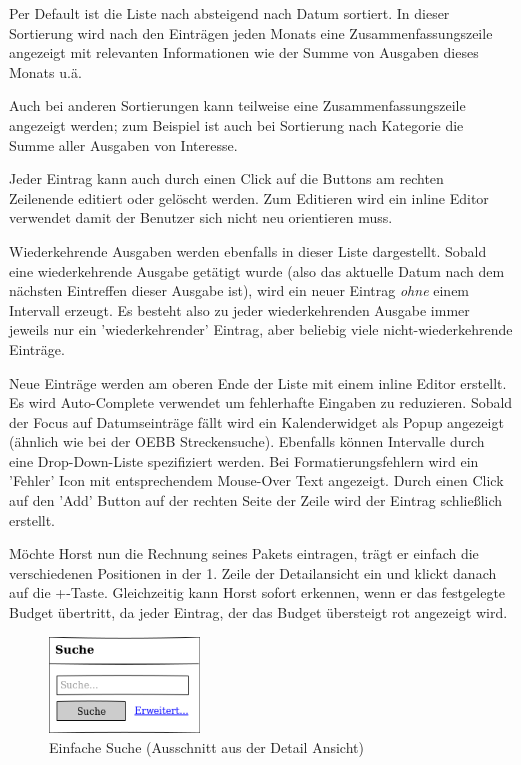 Per Default ist die Liste nach absteigend nach Datum sortiert. In dieser Sortierung wird nach den
Einträgen jeden Monats eine Zusammenfassungszeile angezeigt mit relevanten Informationen wie der Summe von Ausgaben dieses Monats u.ä.

Auch bei anderen Sortierungen kann teilweise eine Zusammenfassungszeile angezeigt werden; zum Beispiel ist auch
bei Sortierung nach Kategorie die Summe aller Ausgaben von Interesse.

Jeder Eintrag kann auch durch einen Click auf die Buttons am rechten Zeilenende editiert oder gelöscht werden.
Zum Editieren wird ein inline Editor verwendet damit der Benutzer sich nicht neu orientieren muss.

Wiederkehrende Ausgaben werden ebenfalls in dieser Liste dargestellt. Sobald eine wiederkehrende Ausgabe getätigt wurde
(also das aktuelle Datum nach dem nächsten Eintreffen dieser Ausgabe ist), wird ein neuer Eintrag \emph{ohne} einem Intervall
erzeugt. Es besteht also zu jeder wiederkehrenden Ausgabe immer jeweils nur ein 'wiederkehrender' Eintrag, aber beliebig viele
nicht-wiederkehrende Einträge.

Neue Einträge werden am oberen Ende der Liste mit einem inline Editor erstellt. Es wird Auto-Complete verwendet um fehlerhafte
Eingaben zu reduzieren. Sobald der Focus auf Datumseinträge fällt wird ein Kalenderwidget als Popup angezeigt (ähnlich wie bei der
OEBB Streckensuche). Ebenfalls können Intervalle durch eine Drop-Down-Liste spezifiziert werden. Bei Formatierungsfehlern wird ein 'Fehler' Icon mit entsprechendem Mouse-Over Text angezeigt. Durch einen Click
auf den 'Add' Button auf der rechten Seite der Zeile wird der Eintrag
schließlich erstellt.

M\"ochte Horst nun die Rechnung seines Pakets eintragen, trägt er einfach die
verschiedenen Positionen in der 1. Zeile der Detailansicht ein und klickt danach
auf die \glqq +\grqq-Taste. Gleichzeitig kann Horst sofort erkennen, wenn er das
festgelegte Budget \"ubertritt, da jeder Eintrag, der das Budget übersteigt
rot angezeigt wird.

\begin{figure}[htl]
\centering
\includegraphics[width=4cm]{img/web_simple_search}
\caption{Einfache Suche (Ausschnitt aus der Detail Ansicht)}
\label{fig:web_simple_search}
\end{figure}

